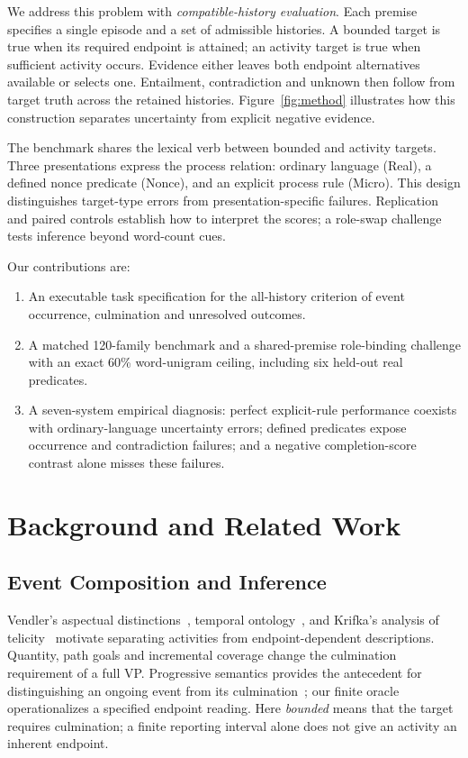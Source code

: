 \documentclass[sigconf,anonymous,review]{acmart}
\begin{document}
We address this problem with \emph{compatible-history evaluation}. Each premise specifies a single episode and a set of admissible histories. A bounded target is true when its required endpoint is attained; an activity target is true when sufficient activity occurs. Evidence either leaves both endpoint alternatives available or selects one. Entailment, contradiction and unknown then follow from target truth across the retained histories. Figure~\ref{fig:method} illustrates how this construction separates uncertainty from explicit negative evidence.

The benchmark shares the lexical verb between bounded and activity targets. Three presentations express the process relation: ordinary language (Real), a defined nonce predicate (Nonce), and an explicit process rule (Micro). This design distinguishes target-type errors from presentation-specific failures. Replication and paired controls establish how to interpret the scores; a role-swap challenge tests inference beyond word-count cues.

Our contributions are:
\begin{enumerate}
\item An executable task specification for the all-history criterion of event occurrence, culmination and unresolved outcomes.
\item A matched 120-family benchmark and a shared-premise role-binding challenge with an exact 60\% word-unigram ceiling, including six held-out real predicates.
\item A seven-system empirical diagnosis: perfect explicit-rule performance coexists with ordinary-language uncertainty errors; defined predicates expose occurrence and contradiction failures; and a negative completion-score contrast alone misses these failures.
\end{enumerate}


\section{Background and Related Work}
\subsection{Event Composition and Inference}
Vendler's aspectual distinctions~\cite{vendler1957}, temporal ontology~\cite{moens1988}, and Krifka's analysis of telicity~\cite{krifka1998} motivate separating activities from endpoint-dependent descriptions. Quantity, path goals and incremental coverage change the culmination requirement of a full VP. Progressive semantics provides the antecedent for distinguishing an ongoing event from its culmination~\cite{landman1992}; our finite oracle operationalizes a specified endpoint reading. Here \emph{bounded} means that the target requires culmination; a finite reporting interval alone does not give an activity an inherent endpoint.
\end{document}
